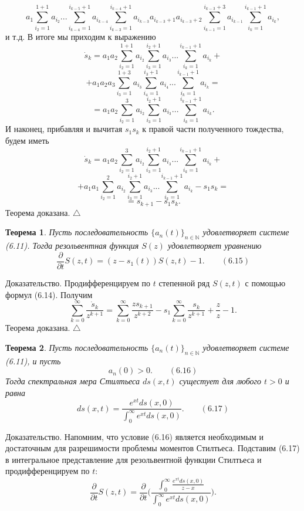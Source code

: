 \documentclass[12 pt, a4 paper]{article}
\theoremstyle{plain}   \newtheorem{Pro}{Задача}
\newtheorem{The}{Теорема}
\begin{document}
$$
  a_1 \sum _{i_2 =1}^{1+1}a_{i_2}...
    \sum _{i_{k-4}=1}^{i_{k-5}+1}a_{i_{k-4}}
	  \sum _{i_{k-3}=1}^{i_{k-4}+1}
	    a_{i_{k-3}}a_{i_{k-3}+1}a_{i_{k-3}+2}
		  \sum _{i_{k-1}=1}^{i_{k-3}+3}a_{i_{k-1}}
		    \sum _{i_k =1}^{i_{k-1}+1}a_{i_k},
$$
и т.д. В итоге мы приходим к выражению
$$
  \dot s_k =a_1 a_2
    \sum _{i_2 =1}^{1+1}a_{i_2}
	  \sum _{i_3 =1}^{i_2 +1}a_{i_3}...
	    \sum _{i_k =1}^{i_{k-1}+1}a_{i_k}+
$$
$$
  +a_1 a_2 a_3
    \sum _{i_3 =1}^{1+3}a_{i_3}
	  \sum _{i_4 =1}^{i_3 +1}a_{i_4}...
	    \sum _{i_k =1}^{i_{k-1}+1}a_{i_k}=
$$
$$
  =a_1 a_2 \sum _{i_2 =1}^{3}a_{i_2}
    \sum _{i_3 =1}^{i_2 +1}a_{i_3}...
	  \sum _{i_k =1}^{i_{k-1}+1}a_{i_k}.
$$
И наконец, прибавляя и вычитая
$ s_1 s_k $
к правой части полученного тождества,
будем иметь
$$
  \dot s_k =a_1 a_2
    \sum _{i_2 =1}^{3}a_{i_2}
	  \sum _{i_3 =1}^{i_2 +1}a_{i_3}...
	    \sum _{i_k =1}^{i_{k-1}+1}a_{i_k}+
$$
$$
  +a_1 a_1 \sum _{i_2 =1}^{2} a_{i_2}
    \sum _{i_3 =1}^{i_2 +1}a_{i_3}...
	  \sum _{i_k =1}^{i_{k-1}+1}a_{i_k}
	    -s_1 s_k =
$$
$$
  =s_{k+1}-s_1 s_k .
$$
Теорема доказана.
$ \triangle $
\begin{The}
Пусть последовательность
$ \{ a_n (t) \} _{n \in \mathbb{N}} $
удовлетворяет системе (6.11).
Тогда резольвентная функция
$ S(z) $
удовлетворяет уравнению
$$
  \frac{\partial}{\partial t}S(z,t)=
    (z-s_1 (t))S(z,t)-1.
	  \qquad (6.15)
$$
\end{The}
{\Large Доказательство.}
Продифференцируем по
$ t $
степенной ряд
$ S(z,t) $
с помощью формул (6.14). Получим
$$
  \sum _{k=0}^{\infty}
    \frac{\dot s_k}{z^{k+1}}=
	  \sum _{k=0}^{\infty}
	    \frac{zs_{k+1}}{z^{k+2}}-s_1
		  \sum _{k=0}^{\infty}
		    \frac{s_k}{z^{k+1}}
			  +\frac{z}{z}-1.
$$
Теорема доказана.
$ \triangle $
\begin{The}
Пусть последовательность
$ \{ a_n (t) \} _{n \in \mathbb{N}} $
удовлетворяет системе (6.11), и пусть
$$
  a_n (0)>0 .
    \qquad (6.16)
$$
Тогда спектральная мера Стилтьеса
$ ds(x,t) $
сущестует для любого
$ t>0 $
и равна
$$
  ds(x,t)=\frac
    {e^{xt}ds(x,0)}
	  {\int _0 ^{\infty} e^{xt}ds(x,0)}.
	    \qquad (6.17)
$$
\end{The}
{\Large Доказательство.}
Напомним, что условие (6.16) является необходимым и достаточным
для разрешимости проблемы моментов Стилтьеса.
Подставим (6.17) в интегральное представление
для резольвентной функции Стилтьеса и продифференцируем по
$ t : $
$$
  \frac{\partial}{\partial t}S(z,t)=
    \frac{\partial}{\partial t} \Biggl (
	  \frac{\int _0 ^{\infty}
	    \frac{e^{xt}ds(x,0)}{z-x}}
	 {\int _0 ^{\infty}e^{xt}ds(x,0)} \Biggr ) .
$$
\end{document}
